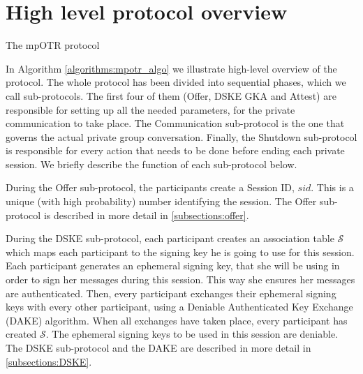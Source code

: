 \section{High level protocol overview}
\begin{algorithm}[H]
  \label{algorithms:mpotr_algo}
  \caption{The mpOTR protocol}
\end{algorithm}

In Algorithm \ref{algorithms:mpotr_algo} we illustrate high-level overview of the protocol. The whole protocol has been divided into sequential phases, which we call sub-protocols. The first four of them (Offer, DSKE GKA and Attest) are responsible for setting up all the needed parameters, for the private communication to take place. The Communication sub-protocol is the one that governs the actual private group conversation. Finally, the Shutdown sub-protocol is responsible for every action that needs to be done before ending each private session. We briefly describe the function of each sub-protocol below.

During the Offer sub-protocol, the participants create a Session ID, $sid$. This is a unique (with high probability) number identifying the session. The Offer sub-protocol is described in more detail in \ref{subsections:offer}. 

During the DSKE sub-protocol, each participant creates an association table $\mathcal{S}$ which maps each participant to the signing key he is going to use for this session. Each participant generates an ephemeral signing key, that she will be using in order to sign her messages during this session. This way she ensures her messages are authenticated. Then, every participant exchanges their ephemeral signing keys with every other participant, using a Deniable Authenticated Key Exchange (DAKE) algorithm. When all exchanges have taken place, every participant has created $\mathcal{S}$. The ephemeral signing keys to be used in this session are deniable. The DSKE sub-protocol and the DAKE are described in more detail in \ref{subsections:DSKE}.

